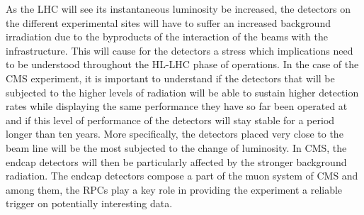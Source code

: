 As the \acl{LHC} will see its instantaneous luminosity be increased, the detectors on the different experimental sites will have to suffer an increased background irradiation due to the byproducts of the interaction of the beams with the infrastructure. This will cause for the detectors a stress which implications need to be understood throughout the \acf{HL-LHC} phase of operations. In the case of the \acf{CMS} experiment, it is important to understand if the detectors that will be subjected to the higher levels of radiation will be able to sustain higher detection rates while displaying the same performance they have so far been operated at and if this level of performance of the detectors will stay stable for a period longer than ten years. More specifically, the detectors placed very close to the beam line will be the most subjected to the change of luminosity. In CMS, the endcap detectors will then be particularly affected by the stronger background radiation. The endcap detectors compose a part of the muon system of CMS and among them, the \acf{RPC}s play a key role in providing the experiment a reliable trigger on potentially interesting data.

